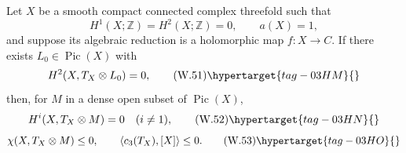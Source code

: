 \begin{theorem}
\hypertarget{tag-03J0}{}\label{wbII:thm:corrected-cdp-global}
\label{wbII:thm:corrected-global}
Let \(X\) be a smooth compact connected complex threefold such that
\[
 H^1(X;\mathbb Z)=H^2(X;\mathbb Z)=0,\qquad a(X)=1,
\]
and suppose its algebraic reduction is a holomorphic map
\(f:X\to C\).  If there exists \(L_0\in\operatorname{Pic}(X)\) with
\[
 H^2(X,T_X\otimes L_0)=0,
\tag{W.51}\hypertarget{tag-03HM}{}\label{wbII:eq:W:5.24}
\]
then, for \(M\) in a dense open subset of \(\operatorname{Pic}(X)\),
\[
 H^i(X,T_X\otimes M)=0\quad(i\ne1),
\tag{W.52}\hypertarget{tag-03HN}{}\label{wbII:eq:W:5.25}
\]
\[
 \chi(X,T_X\otimes M)\le0,\qquad
 \left\langle c_3(T_X),[X]\right\rangle\le0.
\tag{W.53}\hypertarget{tag-03HO}{}\label{wbII:eq:W:5.26}
\]
\end{theorem}



